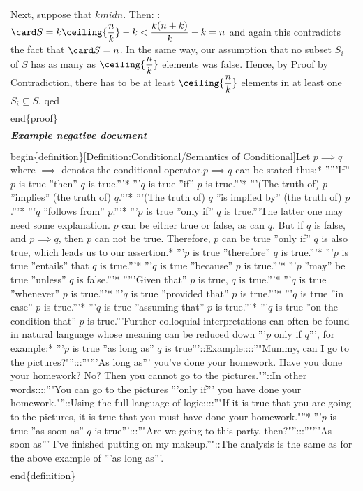 \begin{table}[ht]
\begin{tabular}{p{13cm}}
Next, suppose that $k mid n$. Then: :$\card S = k \ceiling{\dfrac n k} - k < \dfrac {k (n + k) } k - k = n$ and again this contradicts the fact that $\card S = n$. 
In the same way, our assumption that no subset $S_i$ of $S$ has as many as $\ceiling {\dfrac n k}$ elements was false. Hence, by Proof by Contradiction, there has to be at least $\ceiling {\dfrac n k}$ elements in at least one $S_i \subseteq S$. {{qed}} \\end\{proof\}  \\
\midrule
\textit{\textbf{Example negative document}} \\
\midrule
\\begin\{definition\}[Definition:Conditional/Semantics of Conditional]Let $p \implies q$ where $\implies$ denotes the conditional operator.$p \implies q$ can be stated thus:* '''''If'' $p$ is true ''then'' $q$ is true.'''* '''$q$ is true ''if'' $p$ is true.'''* '''(The truth of) $p$ ''implies'' (the truth of) $q$.'''* '''(The truth of) $q$ ''is implied by'' (the truth of) $p$.'''* '''$q$ ''follows from'' $p$.'''* '''$p$ is true ''only if'' $q$ is true.'''The latter one may need some explanation. $p$ can be either true or false, as can $q$. But if $q$ is false, and $p \implies q$, then $p$ can not be true. Therefore, $p$ can be true ''only if'' $q$ is also true, which leads us to our assertion.* '''$p$ is true ''therefore'' $q$ is true.'''* '''$p$ is true ''entails'' that $q$ is true.'''* '''$q$ is true ''because'' $p$ is true.'''* '''$p$ ''may'' be true ''unless'' $q$ is false.'''* '''''Given that'' $p$ is true, $q$ is true.'''* '''$q$ is true ''whenever'' $p$ is true.'''* '''$q$ is true ''provided that'' $p$ is true.'''* '''$q$ is true ''in case'' $p$ is true.'''* '''$q$ is true ''assuming that'' $p$ is true.'''* '''$q$ is true ''on the condition that'' $p$ is true.'''Further colloquial interpretations can often be found in natural language whose meaning can be reduced down '''$p$ only if $q$''', for example:* '''$p$ is true ''as long as'' $q$ is true'''::Example::::''"Mummy, can I go to the pictures?"'':::''"'''As long as''' you've done your homework. Have you done your homework? No? Then you cannot go to the pictures."''::In other words::::''"You can go to the pictures '''only if''' you have done your homework."''::Using the full language of logic::::''"If it is true that you are going to the pictures, it is true that you must have done your homework."''* '''$p$ is true ''as soon as'' $q$ is true''':::''"Are we going to this party, then?"'':::''"'''As soon as''' I've finished putting on my makeup.''"::The analysis is the same as for the above example of '''as long as'''.\\end\{definition\}
\\
\bottomrule
\end{tabular}
\label{tab:example_theoremqa_theorems}
\end{table}